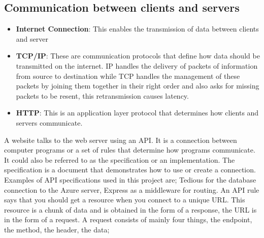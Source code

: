 \subsection{Communication between clients and servers}
\begin{itemize}
\item \textbf{Internet Connection}: This enables the transmission of data between clients and server
\item \textbf{TCP/IP}: These are communication protocols that define how data should be transmitted on the internet. IP handles the delivery of packets of information from source to destination while \gls{TCP} handles the management of these packets by joining them together in their right order and also asks for missing packets to be resent, this retransmission causes latency.
\item \textbf{HTTP}: This is an application layer protocol that determines how clients and servers communicate.
\end{itemize}
A website talks to the web server using an \gls{API}. It is a connection between computer programs or a set of rules that determine how programs communicate. It could also be referred to as the specification or an implementation. The specification is a document that demonstrates how to use or create a connection. Examples of \gls{API} specifications used in this project are; Tedious for the database connection to the Azure server, Express as a middleware for routing. An \gls{API} rule says that you should get a resource when you connect to a unique \gls{URL}. This resource is a chunk of data and is obtained in the form of a response, the \gls{URL} is in the form of a request. A request consists of mainly four things, the endpoint, the method, the header, the data;
